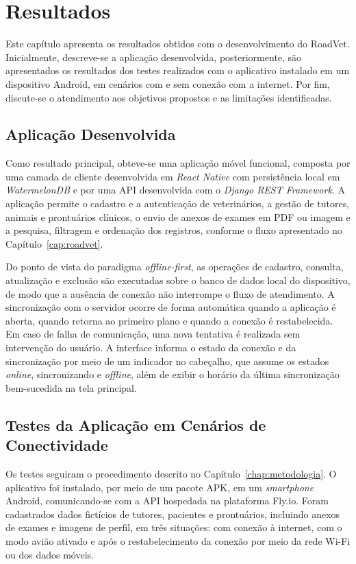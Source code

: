 \chapter{Resultados}
\label{cap:resultados}

Este capítulo apresenta os resultados obtidos com o desenvolvimento do RoadVet. Inicialmente, descreve-se a aplicação desenvolvida, posteriormente, são apresentados os resultados dos testes realizados com o aplicativo instalado em um dispositivo Android, em cenários com e sem conexão com a internet. Por fim, discute-se o atendimento aos objetivos propostos e as limitações identificadas.

\section{Aplicação Desenvolvida}
\label{sec:resultados-aplicacao}

Como resultado principal, obteve-se uma aplicação móvel funcional, composta por uma camada de cliente desenvolvida em \textit{React Native} com persistência local em \textit{WatermelonDB} e por uma API desenvolvida com o \textit{Django REST Framework}. A aplicação permite o cadastro e a autenticação de veterinários, a gestão de tutores, animais e prontuários clínicos, o envio de anexos de exames em PDF ou imagem e a pesquisa, filtragem e ordenação dos registros, conforme o fluxo apresentado no Capítulo~\ref{cap:roadvet}.

Do ponto de vista do paradigma \textit{offline-first}, as operações de cadastro, consulta, atualização e exclusão são executadas sobre o banco de dados local do dispositivo, de modo que a ausência de conexão não interrompe o fluxo de atendimento. A sincronização com o servidor ocorre de forma automática quando a aplicação é aberta, quando retorna ao primeiro plano e quando a conexão é restabelecida. Em caso de falha de comunicação, uma nova tentativa é realizada sem intervenção do usuário. A interface informa o estado da conexão e da sincronização por meio de um indicador no cabeçalho, que assume os estados \textit{online}, sincronizando e \textit{offline}, além de exibir o horário da última sincronização bem-sucedida na tela principal.

\section{Testes da Aplicação em Cenários de Conectividade}
\label{sec:resultados-conectividade}

Os testes seguiram o procedimento descrito no Capítulo~\ref{chap:metodologia}. O aplicativo foi instalado, por meio de um pacote APK, em um \textit{smartphone} Android, comunicando-se com a API hospedada na plataforma Fly.io. Foram cadastrados dados fictícios de tutores, pacientes e prontuários, incluindo anexos de exames e imagens de perfil, em três situações: com conexão à internet, com o modo avião ativado e após o restabelecimento da conexão por meio da rede Wi-Fi ou dos dados móveis.

